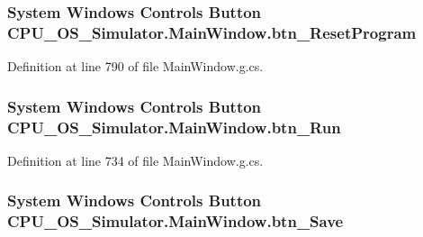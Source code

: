 \subsubsection[{btn\+\_\+\+Reset\+Program}]{\setlength{\rightskip}{0pt plus 5cm}System Windows Controls Button C\+P\+U\+\_\+\+O\+S\+\_\+\+Simulator.\+Main\+Window.\+btn\+\_\+\+Reset\+Program\hspace{0.3cm}{\ttfamily [package]}}\label{class_c_p_u___o_s___simulator_1_1_main_window_ada16565fc869dea1d54013009f5892b4}


Definition at line 790 of file Main\+Window.\+g.\+cs.

\hypertarget{class_c_p_u___o_s___simulator_1_1_main_window_ab3286e931d7154605876654bbf092840}{}
\subsubsection[{btn\+\_\+\+Run}]{\setlength{\rightskip}{0pt plus 5cm}System Windows Controls Button C\+P\+U\+\_\+\+O\+S\+\_\+\+Simulator.\+Main\+Window.\+btn\+\_\+\+Run\hspace{0.3cm}{\ttfamily [package]}}\label{class_c_p_u___o_s___simulator_1_1_main_window_ab3286e931d7154605876654bbf092840}


Definition at line 734 of file Main\+Window.\+g.\+cs.

\hypertarget{class_c_p_u___o_s___simulator_1_1_main_window_a638eee3b21f6ac5d28a5c95c4dad3fc2}{}
\subsubsection[{btn\+\_\+\+Save}]{\setlength{\rightskip}{0pt plus 5cm}System Windows Controls Button C\+P\+U\+\_\+\+O\+S\+\_\+\+Simulator.\+Main\+Window.\+btn\+\_\+\+Save\hspace{0.3cm}{\ttfamily [package]}}\label{class_c_p_u___o_s___simulator_1_1_main_window_a638eee3b21f6ac5d28a5c95c4dad3fc2}


